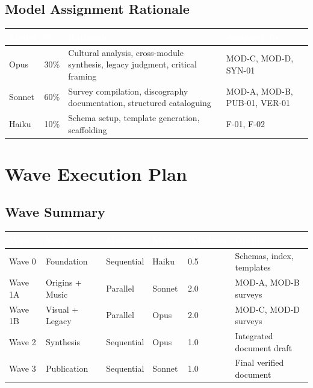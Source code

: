 \documentclass[11pt,letterpaper]{article}
\newcommand{\tableheader}[1]{\textbf{\sffamily\textcolor{white}{#1}}}
\begin{document}
\subsection{Model Assignment Rationale}

\begin{center}
\begin{tabularx}{\textwidth}{L{2cm}C{1.5cm}XL{3cm}}
\toprule
{}
\tableheader{Model} & \tableheader{\%} & \tableheader{Rationale} & \tableheader{Assigned To} \\
\midrule
Opus & 30\% & Cultural analysis, cross-module synthesis, legacy judgment, critical framing & MOD-C, MOD-D, SYN-01 \\
Sonnet & 60\% & Survey compilation, discography documentation, structured cataloguing & MOD-A, MOD-B, PUB-01, VER-01 \\
Haiku & 10\% & Schema setup, template generation, scaffolding & F-01, F-02 \\
\bottomrule
\end{tabularx}
\end{center}

\section{Wave Execution Plan}

\subsection{Wave Summary}

\begin{center}
\begin{tabularx}{\textwidth}{C{1.5cm}L{3cm}C{2cm}C{2cm}C{1.5cm}X}
\toprule
{}
\tableheader{Wave} & \tableheader{Name} & \tableheader{Mode} & \tableheader{Model} & \tableheader{Windows} & \tableheader{Output} \\
\midrule
Wave 0 & Foundation & Sequential & Haiku & 0.5 & Schemas, index, templates \\
Wave 1A & Origins + Music & Parallel & Sonnet & 2.0 & MOD-A, MOD-B surveys \\
Wave 1B & Visual + Legacy & Parallel & Opus & 2.0 & MOD-C, MOD-D surveys \\
Wave 2 & Synthesis & Sequential & Opus & 1.0 & Integrated document draft \\
Wave 3 & Publication & Sequential & Sonnet & 1.0 & Final verified document \\
\bottomrule
\end{tabularx}
\end{center}
\end{document}
